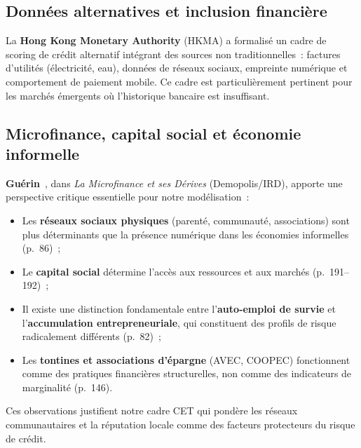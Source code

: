 \documentclass[12pt, a4paper, twocolumn]{article}
\begin{document}
\subsection{Données alternatives et inclusion financière}
\label{subsec:donnees_alt}

La \textbf{Hong Kong Monetary Authority} (HKMA) \cite{hkma} a formalisé un cadre de scoring de crédit alternatif intégrant des sources non traditionnelles~: factures d'utilités (électricité, eau), données de réseaux sociaux, empreinte numérique et comportement de paiement mobile. Ce cadre est particulièrement pertinent pour les marchés émergents où l'historique bancaire est insuffisant.

\subsection{Microfinance, capital social et économie informelle}
\label{subsec:microfinance}

\textbf{Guérin}~\cite{guerin2015}, dans \textit{La Microfinance et ses Dérives} (Demopolis/IRD), apporte une perspective critique essentielle pour notre modélisation~:

\begin{itemize}[leftmargin=*]
  \item Les \textbf{réseaux sociaux physiques} (parenté, communauté, associations) sont plus déterminants que la présence numérique dans les économies informelles (p.~86)~;
  \item Le \textbf{capital social} détermine l'accès aux ressources et aux marchés (p.~191--192)~;
  \item Il existe une distinction fondamentale entre l'\textbf{auto-emploi de survie} et l'\textbf{accumulation entrepreneuriale}, qui constituent des profils de risque radicalement différents (p.~82)~;
  \item Les \textbf{tontines et associations d'épargne} (AVEC, COOPEC) fonctionnent comme des pratiques financières structurelles, non comme des indicateurs de marginalité (p.~146).
\end{itemize}

Ces observations justifient notre cadre CET qui pondère les réseaux communautaires et la réputation locale comme des facteurs protecteurs du risque de crédit.

\end{document}
